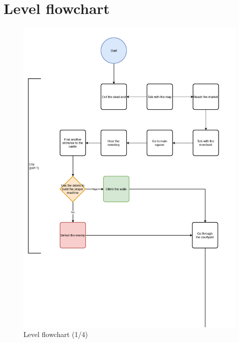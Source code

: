 \section{Level flowchart}

\begin{figure}[H]
  \centering
  \includegraphics[width=13cm]{Images/Diagrams/dynamia_1}
  \caption{Level flowchart (1/4)}
\end{figure}

